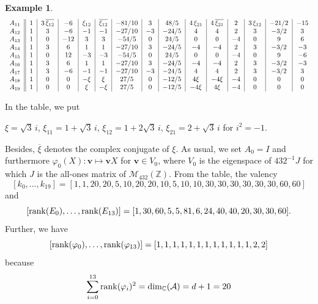 \documentclass[11pt]{amsart}
\theoremstyle{plain} %
\theoremstyle{definition} %
\newtheorem{ex}[thm]{Example} %
\theoremstyle{remark} %
\begin{document}
\begin{ex}
\begin{table}[h]
\[\begin{tabular}{c||c|c|c|c|c|c|c|c|c|c|c|c|c|c}
$A_{11}$& $1$ & $3\,\overline{\xi_{12}}$ & $-6$ & $\xi_{12}$ & $\overline{\xi_{12}}$ & $-81/10$ & $3$ & $48/5$ & $4\,\xi_{21}$ & $4\,\overline{\xi_{21}}$ & $2$ & $3\,\xi_{12}$ & $-21/2$ & $-15$ \\
$A_{12}$& $1$ & $3$ & $-6$ & $-1$ & $-1$ & $-27/10$ & $-3$ & $-24/5$ & $4$ & $4$ & $2$ & $3$ & $-3/2$ & $3$ \\
$A_{13}$& $1$ & $0$ & $-12$ & $3$ & $3$ & $-54/5$ & $0$ & $24/5$ & $0$ & $0$ & $-4$ & $0$ & $9$ & $6$ \\
$A_{14}$& $1$ & $3$ & $6$ & $1$ & $1$ & $-27/10$ & $3$ & $-24/5$ & $-4$ & $-4$ & $2$ & $3$ & $-3/2$ & $-3$ \\
$A_{15}$& $1$ & $0$ & $12$ & $-3$ & $-3$ & $-54/5$ & $0$ & $24/5$ & $0$ & $0$ & $-4$ & $0$ & $9$ & $-6$ \\
$A_{16}$& $1$ & $3$ & $6$ & $1$ & $1$ & $-27/10$ & $3$ & $-24/5$ & $-4$ & $-4$ & $2$ & $3$ & $-3/2$ & $-3$ \\
$A_{17}$& $1$ & $3$ & $-6$ & $-1$ & $-1$ & $-27/10$ & $-3$ & $-24/5$ & $4$ & $4$ & $2$ & $3$ & $-3/2$ & $3$ \\
$A_{18}$& $1$ & $0$ & $0$ & $-\xi$ & $\xi$ & $27/5$ & $0$ & $-12/5$ & $4\xi$ & $-4\xi$ & $-4$ & $0$ & $0$ & $0$ \\
$A_{19}$& $1$ & $0$ & $0$ & $\xi$ & $-\xi$ & $27/5$ & $0$ & $-12/5$ & $-4\xi$ & $4\xi$ & $-4$ & $0$ & $0$ & $0$ \\
\end{tabular}
\]
\end{table}
In the table, we put
\begin{center}
$\xi=\sqrt{3}\,i$, $\xi_{11}=1+\sqrt{3}\,i$, $\xi_{12}=1+2\sqrt{3}\,i$, $\xi_{21}=2+\sqrt{3}\,i$ for $i^2=-1$.
\end{center}
Besides, $\overline{\xi}$ denotes the complex conjugate of $\xi$. As usual, we set $A_0=I$ and furthermore $\varphi_0(X):\bm{v}\mapsto\bm{v}X$ for $\bm{v}\in V_0$, where $V_0$ is the eigenspace of ${432}^{-1}J$ for which $J$ is the all-ones matrix of $\mathcal{M}_{432}(\mathbb{Z})$. From the table, the valency
$$
[k_0,\dots,k_{19}]=
[1, 1, 20, 20, 5, 10, 20, 20, 10, 5, 10, 10, 30, 30, 30, 30, 30, 30, 60, 60]
$$
and
$$
[{\rm rank}(E_0),\dots,{\rm rank}(E_{13})]=
[ 1, 30, 60, 5, 5, 81, 6, 24, 40, 40, 20, 30, 30, 60 ].
$$
Further, we have
$$
[{\rm rank}(\varphi_0),\dots,{\rm rank}(\varphi_{13})]=[1,1,1,1,1,1,1,1,1,1,1,1,2,2]
$$
because 
$$
\sum_{i=0}^{13}{\rm rank}(\varphi_i)^2={\rm dim}_{\mathbb{C}}(\mathcal{A})=d+1=20
$$
\end{ex}
\end{document}
